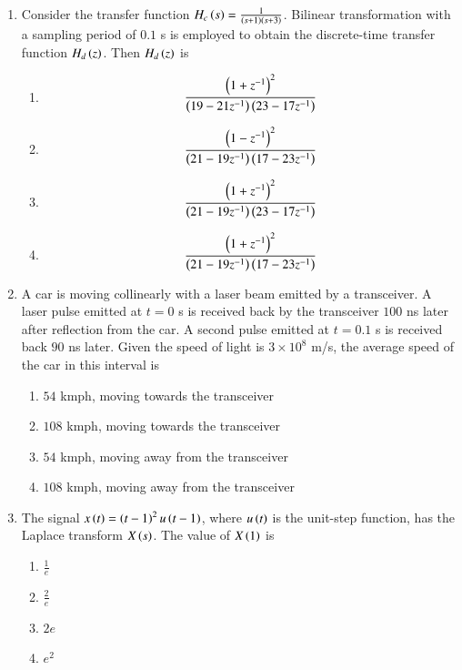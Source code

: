 \documentclass[journal,12pt,onecolumn]{IEEEtran}
\theoremstyle{remark}
\begin{document}
\begin{enumerate}
\item Consider the transfer function $H_c\left(s\right) = \frac{1}{\left(s+1\right)\left(s+3\right)}$. Bilinear transformation with a sampling period of $0.1$ s is employed to obtain the discrete-time transfer function $H_d\left(z\right)$. Then $H_d\left(z\right)$ is \underline{\hspace{2cm}}

\hfill{}
\begin{enumerate}
\item $$\frac{\left(1 + z^{-1}\right)^2}{\left(19 - 21z^{-1}\right)\left(23 - 17z^{-1}\right)}$$
\item $$\frac{\left(1 - z^{-1}\right)^2}{\left(21 - 19z^{-1}\right)\left(17 - 23z^{-1}\right)}$$
\item $$\frac{\left(1 + z^{-1}\right)^2}{\left(21 - 19z^{-1}\right)\left(23 - 17z^{-1}\right)}$$
\item $$\frac{\left(1 + z^{-1}\right)^2}{\left(21 - 19z^{-1}\right)\left(17 - 23z^{-1}\right)}$$
\end{enumerate}

\item A car is moving collinearly with a laser beam emitted by a transceiver. A laser pulse emitted at $t = 0$ s is received back by the transceiver $100$ ns  later after reflection from the car. A second pulse emitted at $t = 0.1$ s is received back $90$ ns later. Given the speed of light is $3 \times 10^8$ m/s, the average speed of the car in this interval is \underline{\hspace{2cm}}

\hfill{}
\begin{enumerate}
\item $54$ kmph, moving towards the transceiver
\item $108$ kmph, moving towards the transceiver
\item $54$ kmph, moving away from the transceiver
\item $108$ kmph, moving away from the transceiver
\end{enumerate}

\item The signal $x\left(t\right) = \left(t - 1\right)^2 u\left(t - 1\right)$, where $u\left(t\right)$ is the unit-step function, has the Laplace transform $X\left(s\right)$. The value of $X\left(1\right)$ is \underline{\hspace{2cm}}

\hfill{}
\begin{enumerate}
\item $\frac{1}{e}$
\item $\frac{2}{e}$
\item $2e$
\item $e^2$
\end{enumerate}


\end{enumerate}
\end{document}
